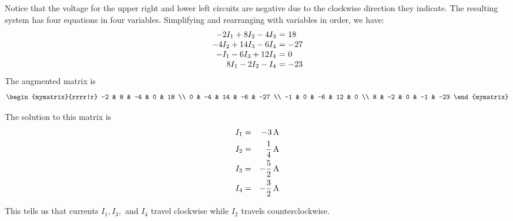 \begin{solution}
Notice that the voltage for the upper right and lower left circuits
are negative due to the clockwise direction they indicate. The
resulting system has four equations in four variables.  Simplifying
and rearranging with variables in order, we have:
\begin{equation*}
  \begin{array}{r@{~}c@{~}l}
    -2I_{1}+8I_{2}-4I_{3}&=&18 \\
    - 4I_{2} + 14I_{3} - 6I_{4} &=& -27 \\
    -I_{1} - 6I_{3} + 12I_{4} &=& 0 \\
    8I_{1}-2I_{2} - I_{4} &=& -23
  \end{array}
\end{equation*}
The augmented matrix is 
\[
\begin{mymatrix}{rrrr|r}
-2 & 8 & -4 & 0 & 18 \\
0 & -4 & 14 & -6 & -27 \\
-1 & 0 & -6 & 12 & 0 \\
8 & -2 & 0 & -1 & -23
\end{mymatrix}
\]

The solution to this matrix is
\begin{eqnarray*}
I_{1} &=& -3 \mathop{\textrm{\rm A}}\nolimits\\
I_{2} &=& \frac{1}{4} \mathop{\textrm{\rm A}}\nolimits\\
I_{3} &=& -\frac{5}{2} \mathop{\textrm{\rm A}}\nolimits\\
I_{4} &=& -\frac{3}{2} \mathop{\textrm{\rm A}}\nolimits
\end{eqnarray*}

This tells us that currents $I_1, I_3,$ and $I_4$ travel clockwise while $I_2$ travels counterclockwise. 
\end{solution}
